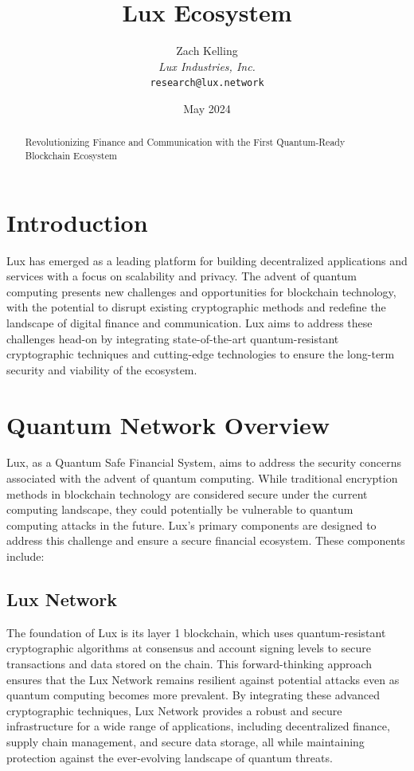 \documentclass[11pt]{article}
\title{Lux Ecosystem}
\author{Zach Kelling\\\textit{Lux Industries, Inc.}\\\texttt{research@lux.network}}
\date{May 2024}
\begin{document}
\luxcoverpage

\begin{abstract}
Revolutionizing Finance and Communication with the First Quantum-Ready Blockchain Ecosystem
\end{abstract}

\tableofcontents
\newpage


\section{Introduction}

Lux has emerged as a leading platform for building decentralized applications and services with a focus on scalability and privacy. The advent of quantum computing presents new challenges and opportunities for blockchain technology, with the potential to disrupt existing cryptographic methods and redefine the landscape of digital finance and communication. Lux aims to address these challenges head-on by integrating state-of-the-art quantum-resistant cryptographic techniques and cutting-edge technologies to ensure the long-term security and viability of the ecosystem.


\section{Quantum Network Overview}

Lux, as a Quantum Safe Financial System, aims to address the security concerns associated with the advent of quantum computing. While traditional encryption methods in blockchain technology are considered secure under the current computing landscape, they could potentially be vulnerable to quantum computing attacks in the future. Lux's primary components are designed to address this challenge and ensure a secure financial ecosystem. These components include:


\subsection{Lux Network}

The foundation of Lux is its layer 1 blockchain, which uses quantum-resistant cryptographic algorithms at consensus and account signing levels to secure transactions and data stored on the chain. This forward-thinking approach ensures that the Lux Network remains resilient against potential attacks even as quantum computing becomes more prevalent. By integrating these advanced cryptographic techniques, Lux Network provides a robust and secure infrastructure for a wide range of applications, including decentralized finance, supply chain management, and secure data storage, all while maintaining protection against the ever-evolving landscape of quantum threats.
\end{document}
